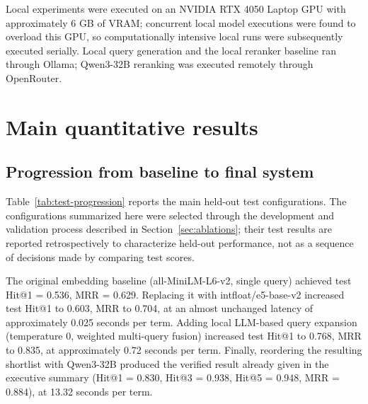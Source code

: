 Local experiments were executed on an NVIDIA RTX 4050 Laptop GPU with approximately 6 GB of VRAM; concurrent local model executions were found to overload this GPU, so computationally intensive local runs were subsequently executed serially. Local query generation and the local reranker baseline ran through Ollama; Qwen3-32B reranking was executed remotely through OpenRouter.

\section{Main quantitative results}
\label{sec:main-results}

\subsection{Progression from baseline to final system}

Table~\ref{tab:test-progression} reports the main held-out test configurations. The configurations summarized here were selected through the development and validation process described in Section~\ref{sec:ablations}; their test results are reported retrospectively to characterize held-out performance, not as a sequence of decisions made by comparing test scores.

The original embedding baseline (all-MiniLM-L6-v2, single query) achieved test Hit@1 = 0.536, MRR = 0.629. Replacing it with intfloat/e5-base-v2 increased test Hit@1 to 0.603, MRR to 0.704, at an almost unchanged latency of approximately 0.025 seconds per term. Adding local LLM-based query expansion (temperature 0, weighted multi-query fusion) increased test Hit@1 to 0.768, MRR to 0.835, at approximately 0.72 seconds per term. Finally, reordering the resulting shortlist with Qwen3-32B produced the verified result already given in the executive summary (Hit@1 = 0.830, Hit@3 = 0.938, Hit@5 = 0.948, MRR = 0.884), at 13.32 seconds per term.

